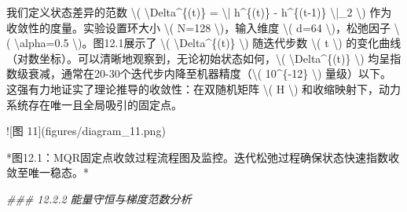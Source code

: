 \documentclass[
  12pt,
]{article}
\newenvironment{Shaded}{}{}
\newcommand{\CommentTok}[1]{\textcolor[rgb]{0.38,0.63,0.69}{\textit{#1}}}
\newcommand{\DecValTok}[1]{\textcolor[rgb]{0.25,0.63,0.44}{#1}}
\newcommand{\FloatTok}[1]{\textcolor[rgb]{0.25,0.63,0.44}{#1}}
\newcommand{\NormalTok}[1]{#1}
\newcommand{\OperatorTok}[1]{\textcolor[rgb]{0.40,0.40,0.40}{#1}}
\begin{document}
\begin{Shaded}
\begin{Highlighting}[]
\NormalTok{我们定义状态差异的范数 }\OperatorTok{\textbackslash{}}\NormalTok{( }\OperatorTok{\textbackslash{}}\NormalTok{Delta}\OperatorTok{\^{}}\NormalTok{\{(t)\} }\OperatorTok{=} \OperatorTok{\textbackslash{}|}\NormalTok{ h}\OperatorTok{\^{}}\NormalTok{\{(t)\} }\OperatorTok{{-}}\NormalTok{ h}\OperatorTok{\^{}}\NormalTok{\{(t}\OperatorTok{{-}}\DecValTok{1}\NormalTok{)\} }\OperatorTok{\textbackslash{}|}\NormalTok{\_}\DecValTok{2} \OperatorTok{\textbackslash{}}\NormalTok{) 作为收敛性的度量。实验设置环大小 }\OperatorTok{\textbackslash{}}\NormalTok{( N}\OperatorTok{=}\DecValTok{128} \OperatorTok{\textbackslash{}}\NormalTok{)，输入维度 }\OperatorTok{\textbackslash{}}\NormalTok{( d}\OperatorTok{=}\DecValTok{64} \OperatorTok{\textbackslash{}}\NormalTok{)，松弛因子 }\OperatorTok{\textbackslash{}}\NormalTok{( }\OperatorTok{\textbackslash{}}\NormalTok{alpha}\OperatorTok{=}\FloatTok{0.5} \OperatorTok{\textbackslash{}}\NormalTok{)。图}\FloatTok{12.1}\NormalTok{展示了 }\OperatorTok{\textbackslash{}}\NormalTok{( }\OperatorTok{\textbackslash{}}\NormalTok{Delta}\OperatorTok{\^{}}\NormalTok{\{(t)\} }\OperatorTok{\textbackslash{}}\NormalTok{) 随迭代步数 }\OperatorTok{\textbackslash{}}\NormalTok{( t }\OperatorTok{\textbackslash{}}\NormalTok{) 的变化曲线（对数坐标）。可以清晰地观察到，无论初始状态如何，}\OperatorTok{\textbackslash{}}\NormalTok{( }\OperatorTok{\textbackslash{}}\NormalTok{Delta}\OperatorTok{\^{}}\NormalTok{\{(t)\} }\OperatorTok{\textbackslash{}}\NormalTok{) 均呈指数级衰减，通常在}\DecValTok{20}\OperatorTok{{-}}\DecValTok{30}\NormalTok{个迭代步内降至机器精度（}\OperatorTok{\textbackslash{}}\NormalTok{( }\DecValTok{10}\OperatorTok{\^{}}\NormalTok{\{}\OperatorTok{{-}}\DecValTok{12}\NormalTok{\} }\OperatorTok{\textbackslash{}}\NormalTok{) 量级）以下。这强有力地证实了理论推导的收敛性：在双随机矩阵 }\OperatorTok{\textbackslash{}}\NormalTok{( H }\OperatorTok{\textbackslash{}}\NormalTok{) 和收缩映射下，动力系统存在唯一且全局吸引的固定点。}

\OperatorTok{!}\NormalTok{[图 }\DecValTok{11}\NormalTok{](figures}\OperatorTok{/}\NormalTok{diagram\_11.png)}

\OperatorTok{*}\NormalTok{图}\FloatTok{12.1}\NormalTok{：MQR固定点收敛过程流程图及监控。迭代松弛过程确保状态快速指数收敛至唯一稳态。}\OperatorTok{*}

\CommentTok{\#\#\# 12.2.2 能量守恒与梯度范数分析}


\end{Highlighting}
\end{Shaded}
\end{document}
